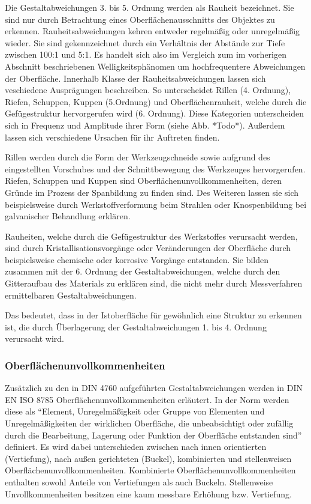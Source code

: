 Die Gestaltabweichungen 3. bis 5. Ordnung werden als Rauheit bezeichnet. Sie sind nur durch Betrachtung eines Oberflächenausschnitts des Objektes zu erkennen. Rauheitsabweichungen kehren entweder regelmäßig oder unregelmäßig wieder. Sie sind gekennzeichnet durch ein Verhältnis der Abstände zur Tiefe zwischen 100:1 und 5:1. Es handelt sich also im Vergleich zum im vorherigen Abschnitt beschriebenen Welligkeitsphänomen um hochfrequentere Abweichungen der Oberfläche. 
Innerhalb Klasse der Rauheitsabweichungen lassen sich veschiedene Ausprägungen beschreiben. So unterscheidet Rillen (4. Ordnung), Riefen, Schuppen, Kuppen (5.Ordnung) und Oberflächenrauheit, welche durch die Gefügestruktur hervorgerufen wird (6. Ordnung).
Diese Kategorien unterscheiden sich in Frequenz und Amplitude ihrer Form (siehe Abb. *Todo*). Außerdem lassen sich verschiedene Ursachen für ihr Auftreten finden. 

Rillen werden durch die Form der Werkzeugschneide sowie aufgrund des eingestellten Vorschubes und der Schnittbewegung des Werkzeuges hervorgerufen.
Riefen, Schuppen und Kuppen sind Oberflächenunvollkommenheiten, deren Gründe im Prozess der Spanbildung zu finden sind. Des Weiteren lassen sie sich beispielsweise durch Werkstoffverformung beim Strahlen oder Knospenbildung bei galvanischer Behandlung erklären. 

Rauheiten, welche durch die Gefügestruktur des Werkstoffes verursacht werden, sind durch Kristallisationsvorgänge oder Veränderungen der Oberfläche durch beispielsweise chemische oder korrosive Vorgänge entstanden. Sie bilden zusammen mit der 6. Ordnung der Gestaltabweichungen, welche durch den Gitteraufbau des Materials zu erklären sind, die nicht mehr durch Messverfahren ermittelbaren Gestaltabweichungen. 

Das bedeutet, dass in der Istoberfläche für gewöhnlich eine Struktur zu erkennen ist, die durch Überlagerung der Gestaltabweichungen 1. bis 4. Ordnung verursacht wird. 

\subsubsection{Oberflächenunvollkommenheiten}

Zusätzlich zu den in DIN 4760 aufgeführten Gestaltabweichungen werden in DIN EN ISO 8785 Oberflächenunvollkommenheiten erläutert. In der Norm werden diese als "`Element, Unregelmäßigkeit oder Gruppe von Elementen und Unregelmäßigkeiten der wirklichen Oberfläche, die unbeabsichtigt oder zufällig durch die Bearbeitung, Lagerung oder Funktion der Oberfläche entstanden sind"' definiert. Es wird dabei unterschieden zwischen nach innen orientierten (Vertiefung), nach außen gerichteten (Buckel), kombinierten und stellenweisen Oberflächenunvollkommenheiten. Kombinierte Oberflächenunvollkommenheiten enthalten sowohl Anteile von Vertiefungen als auch Buckeln. Stellenweise Unvollkommenheiten besitzen eine kaum messbare Erhöhung bzw. Vertiefung. 

